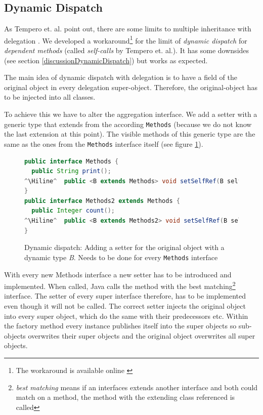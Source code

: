 \documentclass{report}
\newcommand{\Hiline}{\makebox[0pt][l]{\color[rgb]{1,0.96,0.98}\rule[-4pt]{\linewidth}{12.5pt}}}
\begin{document}
\subsection{Dynamic Dispatch}

As Tempero et. al. point out, there are some limits to multiple inheritance with delegation \cite{Tempero-Multiple-2000}. We developed a workaround\footnote{The workaround is available online \cite{Peuscher-GitHub-EP-2014}} for the limit of \emph{dynamic dispatch} for \emph{dependent methods} (called \emph{self-calls} by Tempero et. al.). It has some downsides (see section \ref{discussionDynamicDispatch}) but works as expected.

The main idea of dynamic dispatch with delegation is to have a field of the original object in every delegation super-object. Therefore, the original-object has to be injected into all classes.

To achieve this we have to alter the aggregation interface. We add a setter with a generic type that extends from the according \lstinline{Methods} (because we do not know the last extension at this point). The visible methods of this generic type are the same as the ones from the \lstinline{Methods} interface itself (see figure \ref{dynamicDispatchMethods}).

\begin{figure}[H]
\begin{lstlisting}[language=java]
public interface Methods {
  public String print();
^\Hiline^  public <B extends Methods> void setSelfRef(B selfRef);
}
public interface Methods2 extends Methods {
  public Integer count();
^\Hiline^  public <B extends Methods2> void setSelfRef(B selfRef);
}
\end{lstlisting}
\caption{Dynamic dispatch: Adding a setter for the original object with a dynamic type \emph{B}. Needs to be done for every \lstinline{Methods} interface}
\label{dynamicDispatchMethods}
\end{figure}

With every new Methods interface a new setter has to be introduced and implemented. When called, Java calls the method with the best matching\footnote{\emph{best matching} means if an interfaces extends another interface and both could match on a method, the method with the extending class referenced is called} interface. The setter of every super interface therefore, has to be implemented even though it will not be called. The correct setter injects the original object into every super object, which do the same with their predecessors etc. Within the factory method every instance publishes itself into the super objects so sub-objects overwrites their super objects and the original object overwrites all super objects.
\end{document}
